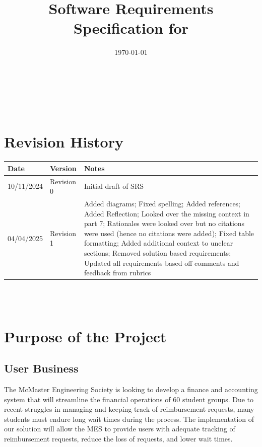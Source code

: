 \documentclass[12pt]{article}
\begin{document}
\title{Software Requirements Specification for \progname} 
\author{\authname}
\date{\today}
	
\maketitle

~\newpage


\tableofcontents

~\newpage

\section*{Revision History}

\begin{tabularx}{\textwidth}{p{3cm}p{2cm}X}
\toprule
\textbf{Date} & \textbf{Version} & \textbf{Notes} \\
\midrule
10/11/2024 & Revision 0 & Initial draft of SRS \\
04/04/2025 & Revision 1 & Added diagrams; Fixed spelling; Added references; Added Reflection; Looked over the missing context in part 7; Rationales were looked over but no citations were used (hence no citations were added); Fixed table formatting; Added additional context to unclear sections; Removed solution based requirements; Updated all requirements based off comments and feedback from rubrics \\
\bottomrule
\end{tabularx}

~\\

~\newpage
\section{Purpose of the Project}
\subsection{User Business}
The McMaster Engineering Society is looking to develop a finance and accounting system that will streamline the financial operations of 60 student groups. Due to recent struggles in managing and keeping track of reimbursement requests, many students must endure long wait times during the process. The implementation of our solution will allow the MES to provide users with adequate tracking of reimbursement requests, reduce the loss of requests, and lower wait times.
\end{document}
